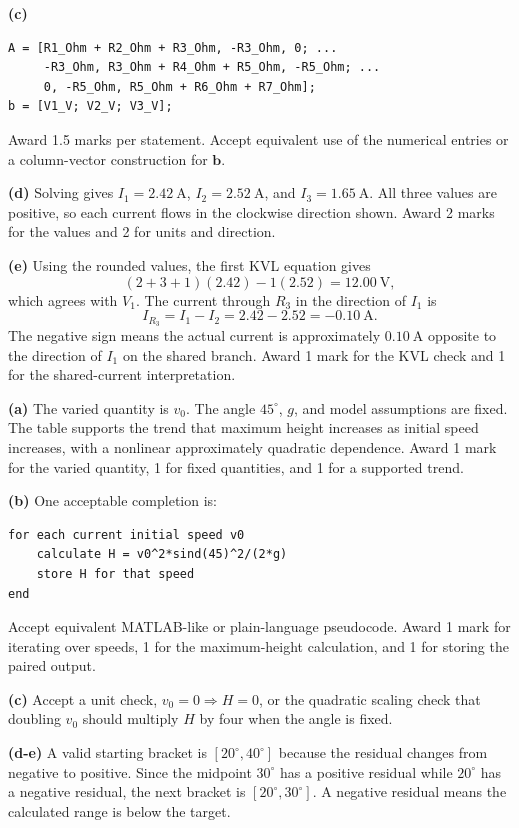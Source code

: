 \documentclass[11pt,a4paper]{article}
\newcommand{\questiontitle}[1]{\vspace{5pt}{\large\color{navy}\textbf{#1}}\par\vspace{2pt}}
\begin{document}
\textbf{(c)}
\begin{lstlisting}
A = [R1_Ohm + R2_Ohm + R3_Ohm, -R3_Ohm, 0; ...
     -R3_Ohm, R3_Ohm + R4_Ohm + R5_Ohm, -R5_Ohm; ...
     0, -R5_Ohm, R5_Ohm + R6_Ohm + R7_Ohm];
b = [V1_V; V2_V; V3_V];
\end{lstlisting}
Award 1.5 marks per statement. Accept equivalent use of the numerical entries or a column-vector construction for \(\mathbf{b}\).

\textbf{(d)} Solving gives \(I_1=2.42\ \mathrm{A}\), \(I_2=2.52\ \mathrm{A}\), and \(I_3=1.65\ \mathrm{A}\). All three values are positive, so each current flows in the clockwise direction shown. Award 2 marks for the values and 2 for units and direction.

\textbf{(e)} Using the rounded values, the first KVL equation gives
\[
  (2+3+1)(2.42)-1(2.52)=12.00\ \mathrm{V},
\]
which agrees with \(V_1\). The current through \(R_3\) in the direction of \(I_1\) is
\[
  I_{R_3}=I_1-I_2=2.42-2.52=-0.10\ \mathrm{A}.
\]
The negative sign means the actual current is approximately \(0.10\ \mathrm{A}\) opposite to the direction of \(I_1\) on the shared branch. Award 1 mark for the KVL check and 1 for the shared-current interpretation.

\questiontitle{Question 3 - 18 marks}

\textbf{(a)} The varied quantity is \(v_0\). The angle \(45^\circ\), \(g\), and model assumptions are fixed. The table supports the trend that maximum height increases as initial speed increases, with a nonlinear approximately quadratic dependence. Award 1 mark for the varied quantity, 1 for fixed quantities, and 1 for a supported trend.

\textbf{(b)} One acceptable completion is:
\begin{lstlisting}
for each current initial speed v0
    calculate H = v0^2*sind(45)^2/(2*g)
    store H for that speed
end
\end{lstlisting}
Accept equivalent MATLAB-like or plain-language pseudocode. Award 1 mark for iterating over speeds, 1 for the maximum-height calculation, and 1 for storing the paired output.

\textbf{(c)} Accept a unit check, \(v_0=0\Rightarrow H=0\), or the quadratic scaling check that doubling \(v_0\) should multiply \(H\) by four when the angle is fixed.

\textbf{(d-e)} A valid starting bracket is \([20^\circ,40^\circ]\) because the residual changes from negative to positive. Since the midpoint \(30^\circ\) has a positive residual while \(20^\circ\) has a negative residual, the next bracket is \([20^\circ,30^\circ]\). A negative residual means the calculated range is below the target.
\end{document}
